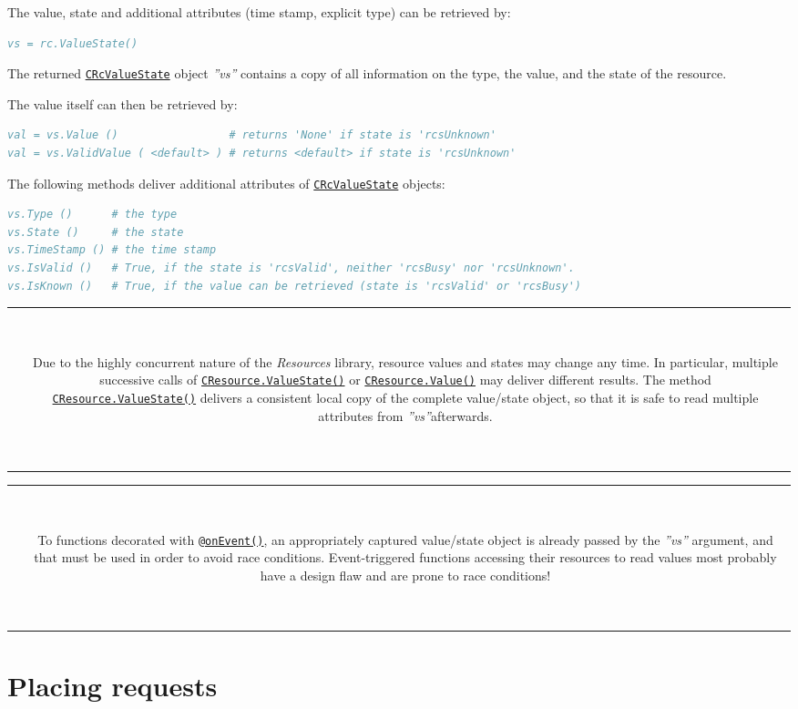 \documentclass[12pt,english,parskip=half,headheight=19pt]{scrreprt}
\newcommand{\warnbox}[1]{
  \par
  \medskip
  \hfill
  \setlength\arrayrulewidth{1pt}
  \begin{tabular}[b]{c|c|}
    
    &
    \,\parbox{0.89\linewidth}{\setlength{\parskip}{0.5em}#1}\,
  \end{tabular}
  \medskip
  \par
}
\newcommand{\refapic}[1]{\href{home2l-api_c/index.html}{\mbox{\texttt{#1}}}}            %
\newcommand{\refapipython}[1]{\href{home2l-api_python/index.html}{\mbox{\texttt{#1}}}}  %
\begin{document}
The value, state and additional attributes (time stamp, explicit type) can be retrieved by:
\begin{lstlisting}[language=comments]
vs = rc.ValueState()
\end{lstlisting}

The returned \refapic{CRcValueState} object \textit{''vs''} contains a copy of all information on the type, the value, and the state of the resource.

The value itself can then be retrieved by:
\begin{lstlisting}[language=comments]
val = vs.Value ()                 # returns 'None' if state is 'rcsUnknown'
val = vs.ValidValue ( <default> ) # returns <default> if state is 'rcsUnknown'
\end{lstlisting}

The following methods deliver additional attributes of \refapic{CRcValueState} objects:
\begin{lstlisting}[language=comments]
vs.Type ()      # the type
vs.State ()     # the state
vs.TimeStamp () # the time stamp
vs.IsValid ()   # True, if the state is 'rcsValid', neither 'rcsBusy' nor 'rcsUnknown'.
vs.IsKnown ()   # True, if the value can be retrieved (state is 'rcsValid' or 'rcsBusy')
\end{lstlisting}


\warnbox{
  Due to the highly concurrent nature of the \textit{Resources} library, resource values and    
  states may change any time. In particular, multiple successive calls of \refapipython{CResource.ValueState()} or
  \refapipython{CResource.Value()} may deliver different results.
  The method \refapipython{CResource.ValueState()} delivers a consistent local copy of 
  the complete value/state object, so that it is safe to read multiple attributes 
  from \textit{''vs''}afterwards. 
}


\warnbox{
  To functions decorated with \refapipython{@onEvent()}, an appropriately captured value/state
  object is already passed by the \textit{''vs''} argument, and that must be used in order
  to avoid race conditions. Event-triggered functions accessing their resources to read values 
  most probably have a design flaw and are prone to race conditions!
}





\section{Placing requests}
\label{sec:rules-requests}
\end{document}

